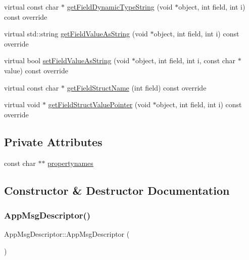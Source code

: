 \begin{DoxyCompactItemize}
\item 
virtual const char $\ast$ \hyperlink{class_app_msg_descriptor_a34ca59ce0eb79e96189a0c6f31fa8ce0}{get\+Field\+Dynamic\+Type\+String} (void $\ast$object, int field, int i) const override
\item 
virtual std\+::string \hyperlink{class_app_msg_descriptor_aa43546ba09c6953ecd4fc9e66d16bd76}{get\+Field\+Value\+As\+String} (void $\ast$object, int field, int i) const override
\item 
virtual bool \hyperlink{class_app_msg_descriptor_a0e77c504e3174dfd8c666d286c68b37b}{set\+Field\+Value\+As\+String} (void $\ast$object, int field, int i, const char $\ast$value) const override
\item 
virtual const char $\ast$ \hyperlink{class_app_msg_descriptor_a3879e3c38670b7a85ef43ba4a1ae7408}{get\+Field\+Struct\+Name} (int field) const override
\item 
virtual void $\ast$ \hyperlink{class_app_msg_descriptor_a5eeec27327bfa4d54924a9913006b689}{get\+Field\+Struct\+Value\+Pointer} (void $\ast$object, int field, int i) const override
\end{DoxyCompactItemize}
\subsection*{Private Attributes}
\begin{DoxyCompactItemize}
\item 
const char $\ast$$\ast$ \hyperlink{class_app_msg_descriptor_a4fb3b9dd77f943bb3aa1587c8d28c1c8}{propertynames}
\end{DoxyCompactItemize}


\subsection{Constructor \& Destructor Documentation}
\mbox{\label{class_app_msg_descriptor_a6db2ddcf43396f5c9f97311e757e3b51}} 
\subsubsection{\texorpdfstring{App\+Msg\+Descriptor()}{AppMsgDescriptor()}}
{\footnotesize\ttfamily App\+Msg\+Descriptor\+::\+App\+Msg\+Descriptor (\begin{DoxyParamCaption}{ }\end{DoxyParamCaption})}

